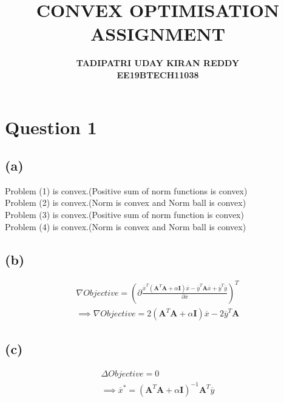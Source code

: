\documentclass{article}
\begin{document}
\title{\textbf{CONVEX OPTIMISATION}\\{\textbf{ASSIGNMENT }}}
\author{\textbf{TADIPATRI UDAY KIRAN REDDY}\\\textbf{EE19BTECH11038}}
\maketitle

\section*{\hfil Question 1}
\subsection*{(a)}
Problem (1) is convex.(Positive sum of norm functions is convex)\\
Problem (2) is convex.(Norm is convex and Norm ball is convex)\\
Problem (3) is convex.(Positive sum of norm function is convex)\\
Problem (4) is convex.(Norm is convex and Norm ball is convex)
\subsection*{(b)}
\begin{gather*}
	\nabla Objective = \left(\partial \frac{\overline{x}^T(\mathbf{A}^T\mathbf{A}+\alpha \mathbf{I})\overline{x} - \overline{y}^T\mathbf{A}\overline{x} + \overline{y}^T\overline{y}}{\partial \overline{x}}\right)^T\\
	\implies \nabla Objective = 2(\mathbf{A}^T\mathbf{A}+\alpha \mathbf{I})\overline{x} - 2\overline{y}^T\mathbf{A}
\end{gather*}
\subsection*{(c)}
\begin{gather*}
	\Delta Objective = 0\\
	\implies \overline{x}^* = (\mathbf{A}^T\mathbf{A}+\alpha \mathbf{I})^{-1}\mathbf{A}^T\overline{y}
\end{gather*}
\end{document}
